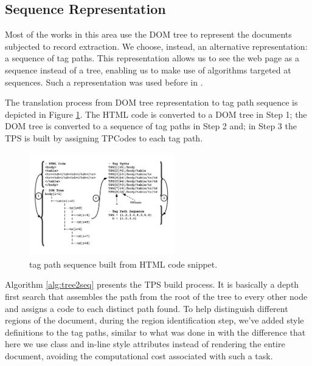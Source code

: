 \subsection{Sequence Representation}\label{ss:seq}
Most of the works in this area use the DOM tree to represent the documents
subjected to record extraction. We choose, instead, an alternative
representation: a sequence of tag paths. This representation allows us to see
the web page as a sequence instead of a tree, enabling us to make use of
algorithms targeted at sequences. Such a representation was used before in
\cite{TPC09, SuffixTree12, TPS2013}.

The translation process from DOM tree representation to tag path sequence is
depicted in Figure \ref{fig:tree2seq}. The HTML code is converted to a DOM tree
in Step 1; the DOM tree is converted to a sequence of tag paths in Step 2 and;
in Step 3 the TPS is built by assigning TPCodes to each tag path. 

\vspace{-0.3cm}

\begin{figure}[H]
  \centering
     \includegraphics[trim={1.5cm 2.5cm 1.5cm
     1.0cm}, width=180pt]{img/tree2seq.pdf}
  \caption{\small{tag path sequence built from HTML code snippet.}}
  \label{fig:tree2seq}
\end{figure}

\vspace{-0.3cm}

Algorithm \ref{alg:tree2seq} presents the TPS build process.
It is basically a depth first search that assembles the path from the root of
the tree to every other node and assigns a code to each distinct path found. To
help distinguish different regions of the document, during the region
identification step, we've added style definitions to the tag paths, similar to
what was done in \cite{grigalis2013towards} with the difference that here we use class
and in-line style attributes instead of rendering the entire document, avoiding
the computational cost associated with such a task.

